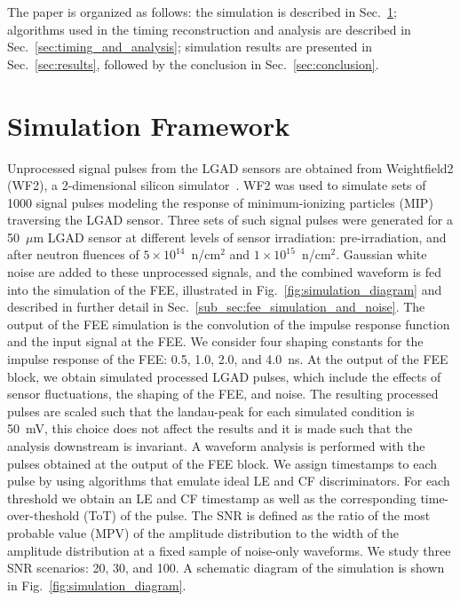 \documentclass[preprint,1p]{elsarticle}
\begin{document}
The paper is organized as follows: the simulation is described in
Sec.~\ref{sec:simulation}; algorithms used in the timing
reconstruction and analysis are described in Sec.~\ref{sec:timing_and_analysis}; simulation results
are presented in Sec.~\ref{sec:results}, followed by the conclusion in
Sec.~\ref{sec:conclusion}.

\section{Simulation Framework}
\label{sec:simulation}


Unprocessed signal pulses from the LGAD sensors are obtained from Weightfield2 (WF2), a 2-dimensional
silicon simulator~\cite{Sadrozinski:2017qpv}. WF2 was used to simulate sets of 1000 signal pulses modeling the
response of minimum-ionizing particles (MIP) traversing the LGAD sensor. Three sets of such signal pulses were
generated for a 50~$\mu$m LGAD sensor at different levels of sensor irradiation: pre-irradiation, and after
neutron fluences of $5\times 10^{14}$~n/cm$^2$ and $1\times 10^{15}$~n/cm$^2$.
Gaussian white noise are added to these unprocessed signals, and the combined waveform is fed into
the simulation of the FEE, illustrated in Fig.~\ref{fig:simulation_diagram} and described in further detail in
Sec.~\ref{sub_sec:fee_simulation_and_noise}. The output of the FEE simulation is the convolution of the
impulse response function and the input signal at the FEE. We consider four shaping constants for the impulse response
of the FEE: 0.5, 1.0, 2.0, and 4.0~\si{ns}. At the output of the FEE block, we obtain simulated processed LGAD pulses,
which include the effects of sensor fluctuations, the shaping of the FEE, and noise.
The resulting processed pulses are scaled such that the landau-peak for each simulated condition is 50~\si{mV},
this choice does not affect the results and it is made such that the analysis downstream is invariant.
A waveform analysis is performed with the pulses obtained at the output of the FEE block.
We assign timestamps to each pulse by using algorithms that emulate
ideal LE and CF discriminators. For each threshold we obtain an LE and CF timestamp as well as the corresponding
time-over-theshold (ToT) of the pulse. The SNR is defined as the ratio of the most probable value (MPV) of the
amplitude distribution to the width of the amplitude distribution at a fixed sample of noise-only waveforms.
We study three SNR scenarios: 20, 30, and 100.
A schematic diagram of the simulation is shown in Fig.~\ref{fig:simulation_diagram}.
\end{document}
